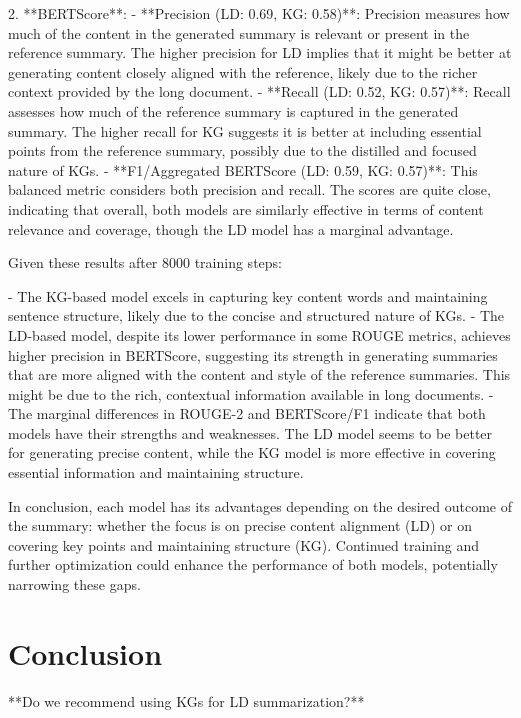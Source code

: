 \documentclass[12pt]{article}
\begin{document}
2. **BERTScore**:
   - **Precision (LD: 0.69, KG: 0.58)**: Precision measures how much of the content in the generated summary is relevant or present in the reference summary. The higher precision for LD implies that it might be better at generating content closely aligned with the reference, likely due to the richer context provided by the long document.
   - **Recall (LD: 0.52, KG: 0.57)**: Recall assesses how much of the reference summary is captured in the generated summary. The higher recall for KG suggests it is better at including essential points from the reference summary, possibly due to the distilled and focused nature of KGs.
   - **F1/Aggregated BERTScore (LD: 0.59, KG: 0.57)**: This balanced metric considers both precision and recall. The scores are quite close, indicating that overall, both models are similarly effective in terms of content relevance and coverage, though the LD model has a marginal advantage.

Given these results after 8000 training steps:

- The KG-based model excels in capturing key content words and maintaining sentence structure, likely due to the concise and structured nature of KGs. 
- The LD-based model, despite its lower performance in some ROUGE metrics, achieves higher precision in BERTScore, suggesting its strength in generating summaries that are more aligned with the content and style of the reference summaries. This might be due to the rich, contextual information available in long documents.
- The marginal differences in ROUGE-2 and BERTScore/F1 indicate that both models have their strengths and weaknesses. The LD model seems to be better for generating precise content, while the KG model is more effective in covering essential information and maintaining structure.

In conclusion, each model has its advantages depending on the desired outcome of the summary: whether the focus is on precise content alignment (LD) or on covering key points and maintaining structure (KG). Continued training and further optimization could enhance the performance of both models, potentially narrowing these gaps.

\section{Conclusion}
**Do we recommend using KGs for LD summarization?**

\newpage
\printbibliography
\end{document}
